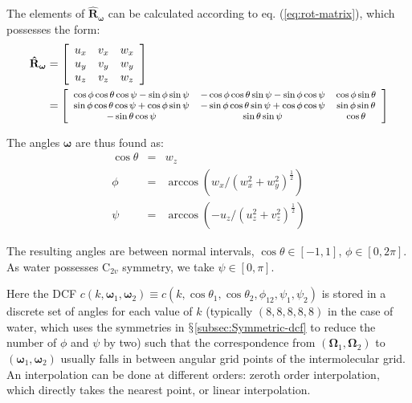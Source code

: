 The elements of $\mathbf{\hat{R}}_{\boldsymbol{\omega}}$ can be calculated
according to eq. (\ref{eq:rot-matrix}), which possesses the form:
\begin{align}
\mathbf{\hat{R}}_{\boldsymbol{\omega}} & =\left[\begin{array}{ccc}
u_{x} & v_{x} & w_{x}\\
u_{y} & v_{y} & w_{y}\\
u_{z} & v_{z} & w_{z}
\end{array}\right]\\
 & =\footnotesize\left[\begin{array}{ccc}
\cos\phi\cos\theta\cos\psi-\sin\phi\sin\psi & -\cos\phi\cos\theta\sin\psi-\sin\phi\cos\psi & \cos\phi\sin\theta\\
\sin\phi\cos\theta\cos\psi+\cos\phi\sin\psi & -\sin\phi\cos\theta\sin\psi+\cos\phi\cos\psi & \sin\phi\sin\theta\\
-\sin\theta\cos\psi & \sin\theta\sin\psi & \cos\theta
\end{array}\right]\nonumber 
\end{align}

The angles $\boldsymbol{\omega}$ are thus found as:
\begin{eqnarray}
\cos\theta & = & w_{z}\nonumber \\
\phi & = & \arccos(w_{x}/(w_{x}^{2}+w_{y}^{2})^{\frac{1}{2}})\label{eq:omega}\\
\psi & = & \arccos(-u_{z}/(u_{z}^{2}+v_{z}^{2})^{\frac{1}{2}})\nonumber 
\end{eqnarray}

The resulting angles are between normal intervals, $\cos\theta\in\left[-1,1\right]$,
$\phi\in\left[0,2\pi\right]$. As water possesses $\mathrm{C}_{2v}$
symmetry, we take $\psi\in\left[0,\pi\right]$. 

Here the \acs{DCF} $c(k,\boldsymbol{\omega}_{1},\boldsymbol{\omega}_{2})\equiv c(k,\cos\theta_{1},\cos\theta_{2},\phi_{12},\psi_{1},\psi_{2})$
is stored in a discrete set of angles for each value of $k$ (typically
$(8,8,8,8,8)$ in the case of water, which uses the symmetries in
$\mathsection$\ref{subsec:Symmetric-dcf} to reduce the number of
$\phi$ and $\psi$ by two) such that the correspondence from $(\mathbf{\Omega}_{1},\mathbf{\Omega}_{2})$
to $(\boldsymbol{\omega}_{1},\boldsymbol{\omega}_{2})$ usually falls
in between angular grid points of the intermolecular grid. An interpolation
can be done at different orders: zeroth order interpolation, which
directly takes the nearest point, or linear interpolation.

